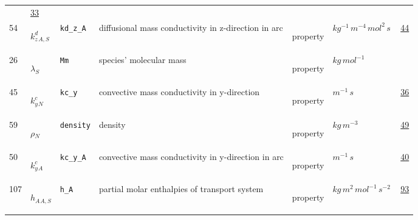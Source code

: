 \begin{longtable}{|p{1cm}|p{2.5cm}|p{4.5cm}|p{8cm}|p{3.0cm}|p{3cm}|p{1cm}|}
             &                 \hyperlink{"e:33"}{ 33 }
                 \\
            54
             & \hypertarget{"v:54"}{ $ {{k^d_z}}{_{A, S}} $}
             & \verb|kd_z_A|
             & diffusional mass conductivity in z-direction in arc
             & \begin{lay}property \end{lay}
             & $ kg^{-1} \,m^{-4} \,mol^{2} \,s \, $
             &                 \hyperlink{"e:44"}{ 44 }
                 \\
            26
             & \hypertarget{"v:26"}{ $ {{\lambda}}{_{S}} $}
             & \verb|Mm|
             & species' molecular mass
             & \begin{lay}property \end{lay}
             & $ kg \,mol^{-1} \, $
             & \\
            45
             & \hypertarget{"v:45"}{ $ {{k^c_y}}{_{N}} $}
             & \verb|kc_y|
             &  convective mass conductivity in y-direction
             & \begin{lay}property \end{lay}
             & $ m^{-1} \,s \, $
             &                 \hyperlink{"e:36"}{ 36 }
                 \\
            59
             & \hypertarget{"v:59"}{ $ {\rho}{_{N}} $}
             & \verb|density|
             & density
             & \begin{lay}property \end{lay}
             & $ kg \,m^{-3} \, $
             &                 \hyperlink{"e:49"}{ 49 }
                 \\
            50
             & \hypertarget{"v:50"}{ $ {{k^c_y}}{_{A}} $}
             & \verb|kc_y_A|
             &  convective mass conductivity in y-direction in arc
             & \begin{lay}property \end{lay}
             & $ m^{-1} \,s \, $
             &                 \hyperlink{"e:40"}{ 40 }
                 \\
            107
             & \hypertarget{"v:107"}{ $ {h_A}{_{A, S}} $}
             & \verb|h_A|
             & partial molar enthalpies of transport system
             & \begin{lay}property \end{lay}
             & $ kg \,m^{2} \,mol^{-1} \,s^{-2} \, $
             &                 \hyperlink{"e:93"}{ 93 }

\end{longtable}
